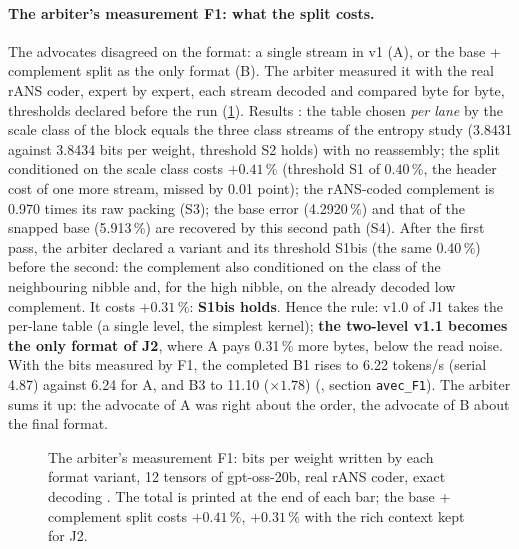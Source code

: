 \paragraph{The arbiter's measurement F1: what the split costs.} The advocates disagreed on the format: a single stream in v1 (A), or the base + complement split as the only format (B). The arbiter measured it with the real rANS coder, expert by expert, each stream decoded and compared byte for byte, thresholds declared before the run (\cref{fig:f1}). Results \mes: the table chosen \emph{per lane} by the scale class of the block equals the three class streams of the entropy study (3.8431 against 3.8434 bits per weight, threshold S2 holds) with no reassembly; the split conditioned on the scale class costs $+0.41\,\%$ (threshold S1 of $0.40\,\%$, the header cost of one more stream, missed by 0.01 point); the rANS-coded complement is 0.970 times its raw packing (S3); the base error (4.2920\,\%) and that of the snapped base (5.913\,\%) are recovered by this second path (S4). After the first pass, the arbiter declared a variant and its threshold S1bis (the same 0.40\,\%) before the second: the complement also conditioned on the class of the neighbouring nibble and, for the high nibble, on the already decoded low complement. It costs $+0.31\,\%$: \textbf{S1bis holds}. Hence the rule: v1.0 of J1 takes the per-lane table (a single level, the simplest kernel); \textbf{the two-level v1.1 becomes the only format of J2}, where A pays 0.31\,\% more bytes, below the read noise. With the bits measured by F1, the completed B1 rises to 6.22 tokens/s (serial 4.87) against 6.24 for A, and B3 to 11.10 ($\times 1.78$) \calc{} (, section \texttt{avec\_F1}). The arbiter sums it up: the advocate of A was right about the order, the advocate of B about the final format.

\begin{figure}[ht]
\centering
\GrapheFun
\caption[Measurement F1: bits per weight of each format variant]{The arbiter's measurement F1: bits per weight written by each format variant, 12 tensors of gpt-oss-20b, real rANS coder, exact decoding \mes. The total is printed at the end of each bar; the base + complement split costs $+0.41\,\%$, $+0.31\,\%$ with the rich context kept for J2.}
\label{fig:f1}
\end{figure}

